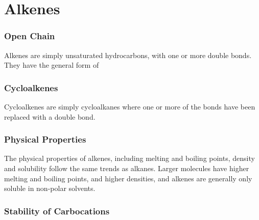 

\pagebreak
\part{Alkenes}
	\section{Open Chain}

		Alkenes are simply unsaturated hydrocarbons, with one or more double bonds. They have the general form of



	\section{Cycloalkenes}

		Cycloalkenes are simply cycloalkanes where one or more of the  bonds have been replaced with a  double
		bond.



	\section{Physical Properties}

		The physical properties of alkenes, including melting and boiling points, density and solubility follow the
		same trends as alkanes. Larger molecules have higher melting and boiling points, and higher densities, and alkenes are
		generally only soluble in non-polar solvents.


	\pagebreak
	\section{Stability of Carbocations}

